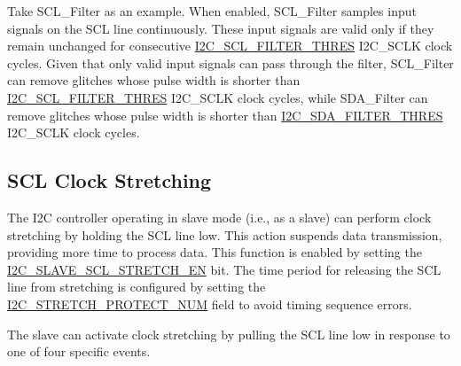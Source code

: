 \documentclass[main\_\_EN.tex]{subfiles}
\begin{document}
Take SCL\_Filter as an example. When enabled, SCL\_Filter samples input signals on the SCL line continuously. These input signals are valid only if they remain unchanged for consecutive \hyperref[fielddesc:I2CSCLFILTERTHRES]{I2C\_SCL\_FILTER\_THRES} I2C\_SCLK clock cycles. Given that only valid input signals can pass through the filter, SCL\_Filter can remove glitches whose pulse width is shorter than \hyperref[fielddesc:I2CSCLFILTERTHRES]{I2C\_SCL\_FILTER\_THRES} I2C\_SCLK clock cycles, while SDA\_Filter can remove glitches whose pulse width is shorter than \hyperref[fielddesc:I2CSDAFILTERTHRES]{I2C\_SDA\_FILTER\_THRES} I2C\_SCLK clock cycles.

\subsection{SCL Clock Stretching}

The I2C controller operating in slave mode (i.e., as a slave) can perform clock stretching by holding the SCL line low. This action suspends data transmission, providing more time to process data. This function is enabled by setting the \hyperref[fielddesc:I2CSLAVESCLSTRETCHEN]{I2C\_SLAVE\_SCL\_STRETCH\_EN} bit. The time period for releasing the SCL line from stretching is configured by setting the \hyperref[fielddesc:I2CSTRETCHPROTECTNUM]{I2C\_STRETCH\_PROTECT\_NUM} field to avoid timing sequence errors.

The slave can activate clock stretching by pulling the SCL line low in response to one of four specific events.
\end{document}
